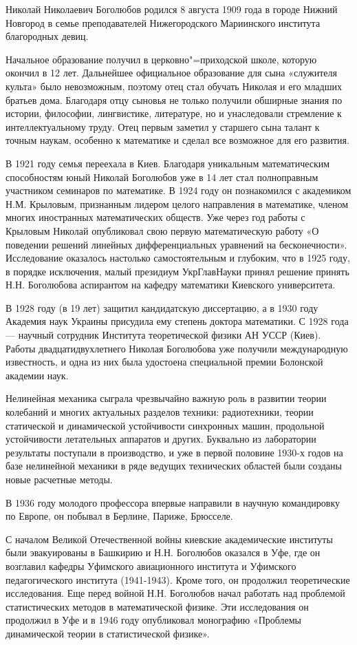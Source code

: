 Николай Николаевич Боголюбов родился 8 августа 1909 года в городе Нижний Новгород в семье преподавателей Нижегородского Мариинского института благородных девиц.

Начальное образование получил в церковно"=приходской школе, которую окончил в 12 лет. Дальнейшее официальное образование для сына «служителя культа» было невозможным, поэтому отец стал обучать Николая и его младших братьев дома. Благодаря отцу сыновья не только получили обширные знания по истории, философии, лингвистике, литературе, но и унаследовали стремление к интеллектуальному труду. Отец первым заметил у старшего сына талант к точным наукам, особенно к математике и сделал все возможное для его развития.

В 1921 году семья переехала в Киев. Благодаря уникальным математическим способностям юный Николай Боголюбов уже в 14 лет стал полноправным участником семинаров по математике. В 1924 году он познакомился с академиком Н.М. Крыловым, признанным лидером целого направления в математике, членом многих иностранных математических обществ. Уже через год работы с Крыловым Николай опубликовал свою первую математическую работу «О поведении решений линейных дифференциальных уравнений на бесконечности». Исследование оказалось настолько самостоятельным и глубоким, что в 1925 году, в порядке исключения, малый президиум УкрГлавНауки принял решение принять Н.Н. Боголюбова аспирантом на кафедру математики Киевского университета.

В 1928 году (в 19 лет) защитил кандидатскую диссертацию, а в 1930 году Академия наук Украины присудила ему степень доктора математики. С 1928 года — научный сотрудник Института теоретической физики АН УССР (Киев). Работы двадцатидвухлетнего Николая Боголюбова уже получили международную известность, и одна из них была удостоена специальной премии Болонской академии наук.

Нелинейная механика сыграла чрезвычайно важную роль в развитии теории колебаний и многих актуальных разделов техники: радиотехники, теории статической и динамической устойчивости синхронных машин, продольной устойчивости летательных аппаратов и других. Буквально из лаборатории результаты поступали в производство, и уже в первой половине 1930-х годов на базе         нелинейной механики в ряде ведущих технических областей были созданы новые расчетные методы.

В 1936 году молодого профессора впервые направили в научную командировку по Европе, он побывал в Берлине, Париже, Брюсселе.

С началом Великой Отечественной войны киевские академические институты были эвакуированы в Башкирию и Н.Н. Боголюбов оказался в Уфе, где он возглавил кафедры Уфимского авиационного института и Уфимского педагогического института (1941-1943). Кроме того, он продолжил теоретические исследования. Еще перед войной Н.Н. Боголюбов начал работать над проблемой статистических методов в математической физике. Эти исследования он продолжил в Уфе и в 1946 году опубликовал монографию «Проблемы динамической теории в статистической физике».

